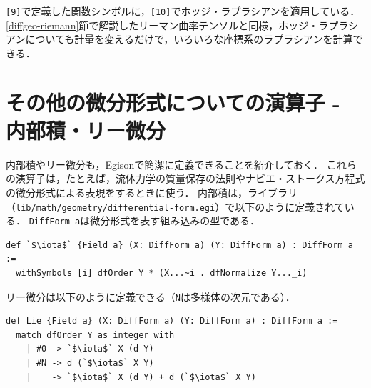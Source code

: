\texttt{[9]}で定義した関数シンボルに，\texttt{[10]}でホッジ・ラプラシアンを適用している．
\ref{diffgeo-riemann}節で解説したリーマン曲率テンソルと同様，ホッジ・ラプラシアンについても計量を変えるだけで，いろいろな座標系のラプラシアンを計算できる．

\section{その他の微分形式についての演算子 - 内部積・リー微分}

内部積やリー微分も，Egisonで簡潔に定義できることを紹介しておく．
これらの演算子は，たとえば，流体力学の質量保存の法則やナビエ・ストークス方程式の微分形式による表現をするときに使う．
内部積は，ライブラリ（\texttt{lib/math/geometry/differential-form.egi}）で以下のように定義されている．
\lstinline{DiffForm a}は微分形式を表す組み込みの型である．
\begin{lstlisting}[language=egison,numbers=none]
def `$\iota$` {Field a} (X: DiffForm a) (Y: DiffForm a) : DiffForm a :=
  withSymbols [i] dfOrder Y * (X...~i . dfNormalize Y..._i)
\end{lstlisting}
リー微分は以下のように定義できる（\lstinline{N}は多様体の次元である）．
\begin{lstlisting}[language=egison,numbers=none]
def Lie {Field a} (X: DiffForm a) (Y: DiffForm a) : DiffForm a :=
  match dfOrder Y as integer with
    | #0 -> `$\iota$` X (d Y)
    | #N -> d (`$\iota$` X Y)
    | _  -> `$\iota$` X (d Y) + d (`$\iota$` X Y)
\end{lstlisting}


